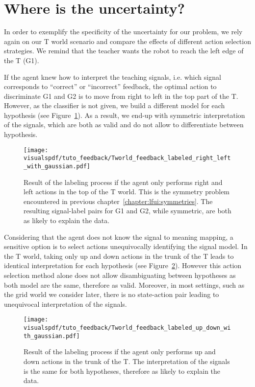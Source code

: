 \section{Where is the uncertainty?}
\label{chapter:planning:where}

In order to exemplify the specificity of the uncertainty for our problem, we rely again on our T world scenario and compare the effects of different action selection strategies. We remind that the teacher wants the robot to reach the left edge of the T (G1).

If the agent knew how to interpret the teaching signals, i.e. which signal corresponds to ``correct'' or ``incorrect'' feedback, the optimal action to discriminate G1 and G2 is to move from right to left in the top part of the T. However, as the classifier is not given, we build a different model for each hypothesis (see Figure~\ref{fig:planningrightleft}). As a result, we end-up with symmetric interpretation of the signals, which are both as valid and do not allow to differentiate between hypothesis.

\begin{figure}[!htbp]
  \centering
  \texttt{[image: \\visualspdf/tuto\_feedback/Tworld\_feedback\_labeled\_right\_left\_with\_gaussian.pdf]}
  \caption{Result of the labeling process if the agent only performs right and left actions in the top of the T world. This is the symmetry problem encountered in previous chapter~\ref{chapter:lfui:symmetries}. The resulting signal-label pairs for G1 and G2, while symmetric, are both as likely to explain the data.}
  \label{fig:planningrightleft}
\end{figure}

Considering that the agent does not know the signal to meaning mapping, a sensitive option is to select actions unequivocally identifying the signal model. In the T world, taking only up and down actions in the trunk of the T leads to identical interpretation for each hypothesis (see Figure~\ref{fig:planningupdown}). However this action selection method alone does not allow disambiguating between hypotheses as both model are the same, therefore as valid. Moreover, in most settings, such as the grid world we consider later, there is no state-action pair leading to unequivocal interpretation of the signals.

\begin{figure}[!htbp]
  \centering
  \texttt{[image: \\visualspdf/tuto\_feedback/Tworld\_feedback\_labeled\_up\_down\_with\_gaussian.pdf]}
  \caption{Result of the labeling process if the agent only performs up and down actions in the trunk of the T. The interpretation of the signals is the same for both hypotheses, therefore as likely to explain the data.}
  \label{fig:planningupdown}
\end{figure}

